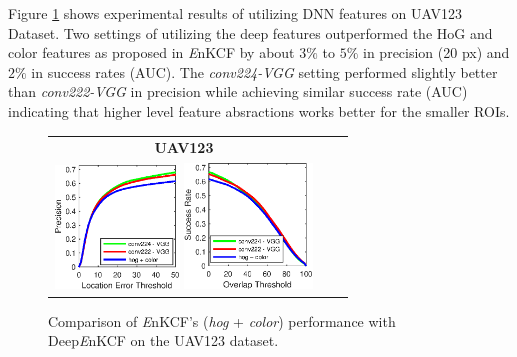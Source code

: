 \documentclass[10pt,twocolumn,letterpaper]{article}
\begin{document}
Figure \ref{fig:UAV123_DATASET_DeepFeatures} shows experimental
results of utilizing DNN features on UAV123 Dataset. Two settings of utilizing the deep
features outperformed the HoG and color features as proposed in {\it
  E}nKCF by about $3\%$ to $5\%$ in precision (20 px) and $2\%$ in
success rates (AUC). The \textit{conv224-VGG} setting performed
slightly better than \textit{conv222-VGG} in precision while achieving
similar success rate (AUC) indicating that higher level feature absractions 
works better for the smaller ROIs.
\begin{figure}[!h]
\centering
\begin{tabular}{ccc}
\tiny\quad\quad\textbf{UAV123}\\
\includegraphics[width=3.30cm]{./figures/pr_deep.eps}
\includegraphics[width=3.40cm]{./figures/sr_deep.eps}\\
\end{tabular}
\caption{Comparison of {\it E}nKCF's ({\it hog} + {\it color}) performance with Deep{\it E}nKCF on the UAV123
dataset.}
\label{fig:UAV123_DATASET_DeepFeatures}
\end{figure}

\end{document}
